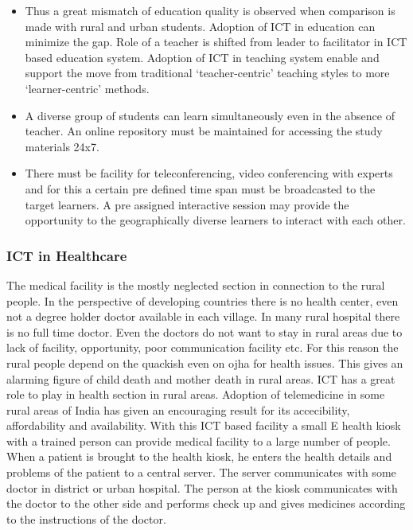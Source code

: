 \documentclass[11pt,largemargins]{homework}
\begin{document}
\begin{itemize}

\item Thus a great mismatch of education quality is observed when comparison is made with rural and urban students. Adoption of ICT in education can minimize the gap. Role of a teacher is shifted from leader to facilitator in ICT based education system. Adoption of ICT in teaching system enable and support the move from traditional `teacher-centric' teaching styles to more `learner-centric' methods. \\

\item A diverse group of students can learn simultaneously even in the absence of teacher. An online repository must be maintained for accessing the study materials 24x7. \\

\item There must be facility for teleconferencing, video conferencing with experts and for this a certain pre defined time span must be broadcasted to the target learners. A pre assigned interactive session may provide the opportunity to the geographically diverse learners to interact with each other.\\
\end{itemize}

\subsubsection{ ICT in Healthcare}
The medical facility is the mostly neglected section in connection to the rural people. In the perspective of developing countries there is no health center, even not a degree holder doctor available in each village. In many rural hospital there is no full time doctor. Even the doctors do not want to stay in rural areas due to lack of facility, opportunity, poor communication facility etc. For this reason the rural people depend on the quackish even on ojha for health issues. This gives an alarming figure of child death and mother death in rural areas. ICT has a great role to play in health section in rural areas. Adoption of telemedicine in some rural areas of India has given an encouraging result for its accecibility, affordability and availability. With this ICT based facility a small E health kiosk with a trained person can provide medical facility to a large number of people. When a patient is brought to the health kiosk, he enters the health details and problems of the patient to a central server. The server communicates with some doctor in district or urban hospital. The person at the kiosk communicates with the doctor to the other side and performs check up and gives medicines according to the instructions of the doctor.\\
\end{document}
